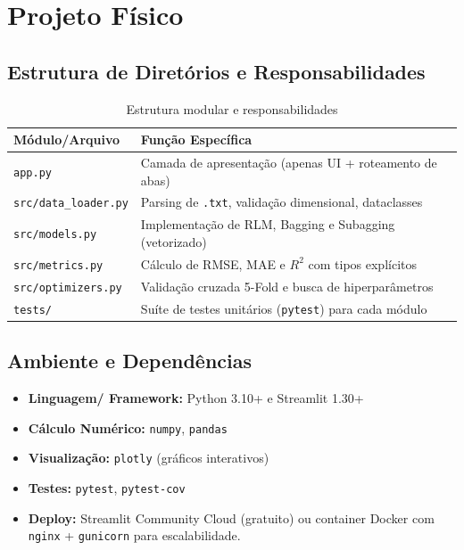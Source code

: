 \documentclass[12pt,a4paper]{article}
\begin{document}
\section{Projeto Físico}

\subsection{Estrutura de Diretórios e Responsabilidades}
\begin{table}[H]
\centering
\caption{Estrutura modular e responsabilidades}
\begin{tabularx}{\textwidth}{l X}
\toprule
\textbf{Módulo/Arquivo} & \textbf{Função Específica} \\
\midrule
\texttt{app.py} & Camada de apresentação (apenas UI + roteamento de abas) \\
\texttt{src/data\_loader.py} & Parsing de \texttt{.txt}, validação dimensional, dataclasses \\
\texttt{src/models.py} & Implementação de RLM, Bagging e Subagging (vetorizado) \\
\texttt{src/metrics.py} & Cálculo de RMSE, MAE e $R^2$ com tipos explícitos \\
\texttt{src/optimizers.py} & Validação cruzada 5-Fold e busca de hiperparâmetros \\
\texttt{tests/} & Suíte de testes unitários (\texttt{pytest}) para cada módulo \\
\bottomrule
\end{tabularx}
\end{table}

\subsection{Ambiente e Dependências}
\begin{itemize}[leftmargin=1.5cm]
    \item \textbf{Linguagem/ Framework:} Python 3.10+ e Streamlit 1.30+
    \item \textbf{Cálculo Numérico:} \texttt{numpy}, \texttt{pandas}
    \item \textbf{Visualização:} \texttt{plotly} (gráficos interativos)
    \item \textbf{Testes:} \texttt{pytest}, \texttt{pytest-cov}
    \item \textbf{Deploy:} Streamlit Community Cloud (gratuito) ou container Docker com \texttt{nginx} + \texttt{gunicorn} para escalabilidade.
\end{itemize}
\end{document}
